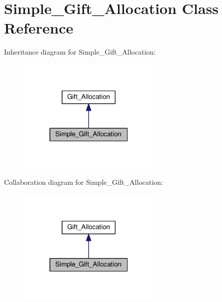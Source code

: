 \hypertarget{class_simple___gift___allocation}{\section{Simple\-\_\-\-Gift\-\_\-\-Allocation Class Reference}
\label{class_simple___gift___allocation}
}


Inheritance diagram for Simple\-\_\-\-Gift\-\_\-\-Allocation\-:
\nopagebreak
\begin{figure}[H]
\begin{center}
\leavevmode
\includegraphics[width=194pt]{class_simple___gift___allocation__inherit__graph}
\end{center}
\end{figure}


Collaboration diagram for Simple\-\_\-\-Gift\-\_\-\-Allocation\-:
\nopagebreak
\begin{figure}[H]
\begin{center}
\leavevmode
\includegraphics[width=194pt]{class_simple___gift___allocation__coll__graph}
\end{center}
\end{figure}
